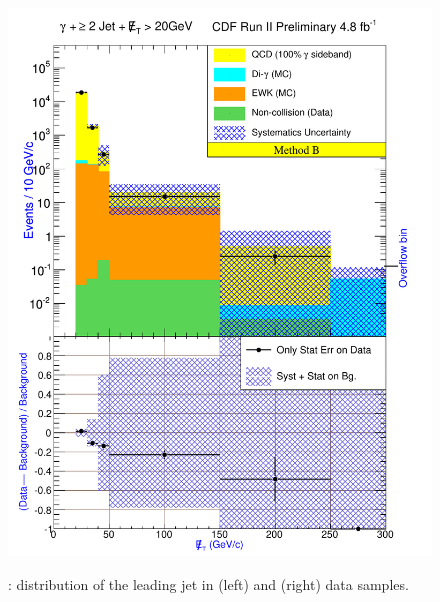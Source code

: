 \documentclass[11pt]{article}
\begin{document}
\begin{figure}[h!]
{ \includegraphics[scale=\resultsHistScale,keepaspectratio=true]{./g30jetmet20_MtdB_plot2_Met.pdf}
}
 \caption{: \met distribution of the leading jet in \phoonejetmettwenty (left) and \photwojetmettwenty (right) data samples.}
 \label{fig:Result_MtdB_gj1Met20_Met}
\end{figure}
\end{document}

